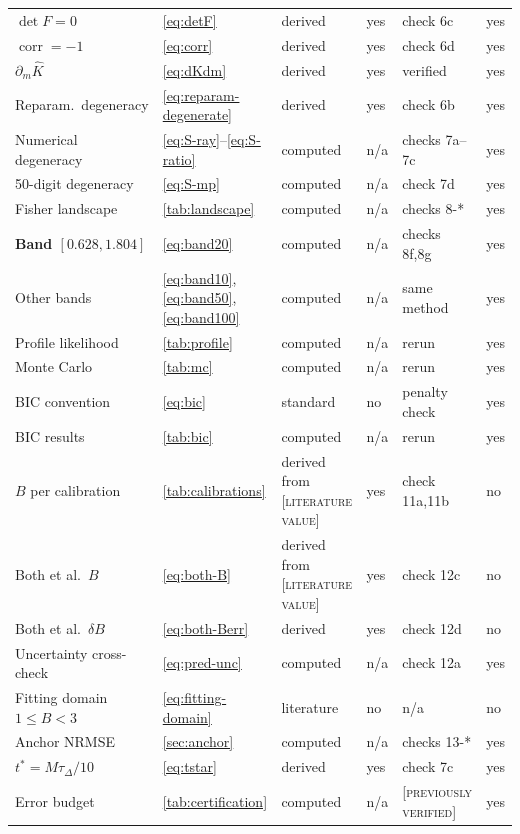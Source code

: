 \documentclass[11pt,a4paper]{article}
\theoremstyle{definition}
\newcommand{\LIT}{\textcolor{blue!55!black}{\footnotesize[\textsc{literature value}]}}
\newcommand{\PREV}{\textcolor{orange!70!black}{\footnotesize[\textsc{previously verified}]}}
\newcommand{\Bnum}{B}
\newcommand{\Lap}[1]{\hat{#1}}
\begin{document}
\begin{longtable}{@{}p{3.5cm}p{1.6cm}p{2.6cm}p{1.5cm}p{1.5cm}p{1.6cm}@{}}
$\det F=0$ & \eqref{eq:detF} & derived & yes & check 6c & yes \\
$\operatorname{corr}=-1$ & \eqref{eq:corr} & derived & yes & check 6d & yes \\
$\partial_{m}\Lap K$ & \eqref{eq:dKdm} & derived & yes & verified & yes \\
Reparam.\ degeneracy & \eqref{eq:reparam-degenerate} & derived & yes &
  check 6b & yes \\
Numerical degeneracy & \eqref{eq:S-ray}--\eqref{eq:S-ratio} & computed &
  n/a & checks 7a--7c & yes \\
50-digit degeneracy & \eqref{eq:S-mp} & computed & n/a & check 7d & yes \\
Fisher landscape & \cref{tab:landscape} & computed & n/a & checks 8-* & yes \\
\textbf{Band $[0.628,1.804]$} & \eqref{eq:band20} & computed & n/a &
  checks 8f,8g & yes \\
Other bands & \eqref{eq:band10},\eqref{eq:band50},\eqref{eq:band100} &
  computed & n/a & same method & yes \\
Profile likelihood & \cref{tab:profile} & computed & n/a & rerun & yes \\
Monte Carlo & \cref{tab:mc} & computed & n/a & rerun & yes \\
BIC convention & \eqref{eq:bic} & standard & no & penalty check & yes \\
BIC results & \cref{tab:bic} & computed & n/a & rerun & yes \\
$\Bnum$ per calibration & \cref{tab:calibrations} & derived from
  \LIT & yes & check 11a,11b & no \\
Both et al.\ $\Bnum$ & \eqref{eq:both-B} & derived from \LIT & yes &
  check 12c & no \\
Both et al.\ $\delta\Bnum$ & \eqref{eq:both-Berr} & derived & yes &
  check 12d & no \\
Uncertainty cross-check & \eqref{eq:pred-unc} & computed & n/a &
  check 12a & yes \\
Fitting domain $1\le\Bnum<3$ & \eqref{eq:fitting-domain} & literature
  \cite{FeherKovacs2021} & no & n/a & no \\
Anchor NRMSE & \cref{sec:anchor} & computed & n/a & checks 13-* & yes \\
$t^{\ast}=M\tau_{\Delta}/10$ & \eqref{eq:tstar} & derived & yes &
  check 7c & yes \\
Error budget & \cref{tab:certification} & computed & n/a & \PREV & yes \\
\bottomrule
\end{longtable}
\end{document}
